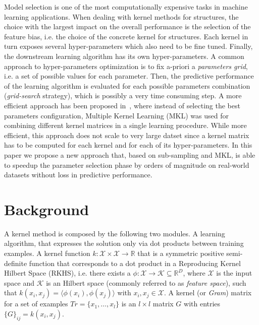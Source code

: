 \documentclass{esannV2}
\newcommand{\1}{{\bf 1}}
\begin{document}
Model selection is one of the most computationally expensive tasks in
machine learning applications. When dealing with kernel methods for structures,
the choice with the largest impact on the overall performance is the selection
of the feature bias, i.e. the choice of the concrete kernel for structures.
Each kernel in turn exposes several hyper-parameters which also need to be
fine tuned. Finally, the downstream learning algorithm has its own hyper-parameters. A common approach to hyper-parameters optimization is to fix
a-priori  a \textit{parameters grid}, i.e. a set of possible values for each
parameter. Then, the predictive performance of the learning algorithm is
evaluated for each possible parameters combination ({\em grid-search}
strategy), which is possibly a very time consuming step.  A more efficient
approach has been proposed in~\cite{FabioAiolliMicheleDonini2015,Massimo2016},
where instead of selecting the best parameters configuration, Multiple Kernel
Learning (MKL) was used for combining different kernel matrices in a single
learning procedure. While more efficient, this approach does not scale to very
large datset since a kernel matrix has to be computed for each kernel and for
each of its hyper-parameters. In this paper we propose a new approach that,
based on sub-sampling and MKL, is able to speedup the parameter selection
phase by orders of magnitude on real-world datasets  without loss in
predictive performance.

\section{Background}
A kernel method is composed by the following two modules.
A learning algorithm, that expresses the solution only via dot products between training examples.
A kernel function ${k}: \mathcal{X} \times \mathcal{X} \rightarrow \mathbb{R}$ that is a symmetric positive semi-definite function that corresponds to a dot product in a Reproducing Kernel Hilbert Space (RKHS), i.e. there exists a $\phi: \mathcal{X} \rightarrow \mathcal{K} \subseteq \mathbb{R}^D$, where $\mathcal{X}$ is the input space and $\mathcal{K}$ is an Hilbert space (commonly referred to as \textit{feature space}), such that $k(x_i,x_j) = \langle \phi(x_i),\phi(x_j) \rangle$ with $x_i,x_j \in \mathcal{X}$. %
A kernel (or \textit{Gram}) matrix for a set of examples $Tr=\{x_1, \ldots, x_l\}$ is an $l \times l$ matrix $G$ with entries $\{G\}_{ij}=k(x_i,x_j)$.
\end{document}
